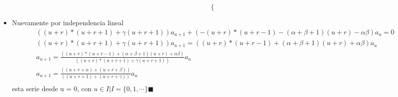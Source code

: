 \begin{mdframed}
\begin{itemize}
{\begin{equation}
\begin{cases}
                \end{cases}
            \end{equation}
        }
        \item {
            Nuevamente por independencia lineal
            \begin{gather*}
                (({u+r})*({u+r+1})+\gamma({u+r+1}))a_{u+1}+(-({u+r})*({u+r-1}) -(\alpha + \beta + 1)({u+r})-\alpha\beta)a_u =0\\
                (({u+r})*({u+r+1})+\gamma({u+r+1}))a_{u+1} =(({u+r})*({u+r-1}) +(\alpha + \beta + 1)({u+r})+\alpha\beta)a_u\\
                a_{u+1} =\frac{(({u+r})*({u+r-1}) +(\alpha + \beta + 1)({u+r})+\alpha\beta)}{(({u+r})*({u+r+1})+\gamma({u+r+1}))}a_u\\
                a_{u+1} =\frac{(({u+r+\alpha})+({u+r+\beta}))}{(({u+r+1})+({u+r+\gamma}))}a_u\\
            \end{gather*}
            esta serie desde u = 0, con $u\in I | I =\{0,1,\cdots\} \blacksquare $
        }
    \end{itemize}
    \end{mdframed}


